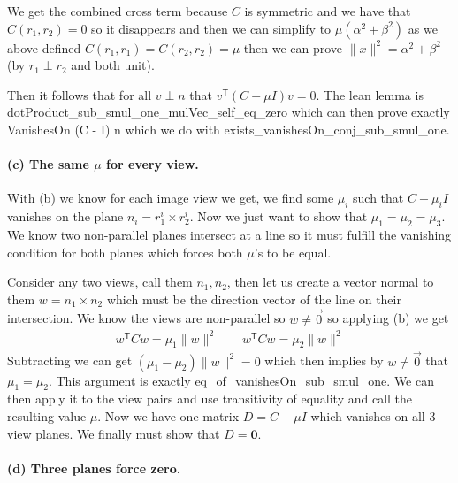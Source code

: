 \documentclass[10pt]{article}
\theoremstyle{plain}
\theoremstyle{definition}
\theoremstyle{remark}
\newcommand{\T}{^{\mathsf{T}}}
\newcommand{\lean}[1]{{\ttfamily\let\us\_\def\_{\us\allowbreak}#1}}
\begin{document}
We get the combined cross term because $C$ is symmetric and we have that $C(r_1,r_2)=0$ so it disappears and then we can simplify to $\mu(\alpha^2+\beta^2)$ as we above defined $C(r_1,r_1)=C(r_2,r_2)=\mu$ then we can prove $\|x\|^2=\alpha^2+\beta^2$ (by $r_1 \perp r_2$ and both unit).

Then it follows that for all $v \perp n$ that $v\T (C -\mu I)v=0$. The lean lemma is 
\lean{dotProduct\_sub\_smul\_one\_mulVec\_self\_eq\_zero} which can then prove exactly \lean{VanishesOn (C - \mu I) n} which we do with \lean{exists\_vanishesOn\_conj\_sub\_smul\_one}.

\paragraph{(c) The same \texorpdfstring{$\mu$}{mu} for every view.}

With (b) we know for each image view we get, we find some $\mu_i$ such that $C-\mu_i I$ vanishes on the plane $n_i = r_1^i \times r^i_2$. Now we just want to show that $\mu_1=\mu_2=\mu_3$. We know two non-parallel planes intersect at a line so it must fulfill the vanishing condition for both planes which forces both $\mu$'s to be equal.

Consider any two views, call them $n_1, n_2$, then let us create a vector normal to them $w=n_1 \times n_2$ which must be the direction vector of the line on their intersection. We know the views are non-parallel so $w \neq \vec{0}$ so applying (b) we get
\begin{align*}
    w\T Cw = \mu_1 \|w\|^2 \qquad w\T Cw = \mu_2 \|w\|^2
\end{align*}
Subtracting we can get $(\mu_1 - \mu_2)\|w\|^2=0$ which then implies by $w \neq \vec{0}$ that $\mu_1=\mu_2$. This argument is exactly \lean{eq\_of\_vanishesOn\_sub\_smul\_one}. We can then apply it to the view pairs and use transitivity of equality and call the resulting value $\mu$. Now we have one matrix $D=C- \mu I$ which vanishes on all 3 view planes. We finally must show that $D=\mathbf{0}$.

\paragraph{(d) Three planes force zero.}
\end{document}
